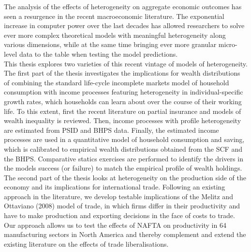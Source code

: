 \thispagestyle{plain}

The analysis of the effects of heterogeneity on aggregate economic outcomes has 
seen a resurgence in the recent macroeconomic literature. The exponential increase
 in computer power over the last decades has allowed researchers to solve ever 
more complex theoretical models with meaningful heterogeneity along various 
dimensions, while at the same time bringing ever more granular micro-level data 
to the table when testing the model predictions. \\
This thesis explores two varieties of this recent vintage of models of heterogeneity.
The first part of the thesis investigates the implications for wealth distributions
of combining the standard life-cycle incomplete markets model of household 
consumption with income processes featuring heterogeneity in individual-specific
growth rates, which households can learn about over the course of their working life.
To this extent, first the recent literature on partial insurance and models
of wealth inequality is reviewed. Then, income processes with profile heterogeneity
 are estimated from PSID and BHPS data. Finally, the estimated income processes
are used in a quantitative model of household consumption and saving, which is 
calibrated to empirical wealth distributions obtained from the SCF and the BHPS.
Comparative statics exercises are performed to identify the drivers in the models
success (or failure) to match the empirical profile of wealth holdings.
The second part of the thesis looks at heterogeneity on the production side of 
the economy and its implications for international trade. Following an existing 
approach in the literature, we develop testable implications of the Melitz and 
Ottaviano (2008) model of trade, in which firms differ in their 
productivity and have to make production and exporting decisions in the face of 
costs to trade. Our approach allows us to test the effects of NAFTA on productivity 
in 64 manufacturing sectors in North America and thereby complement and extend
 the existing literature on the effects of trade liberalisations.